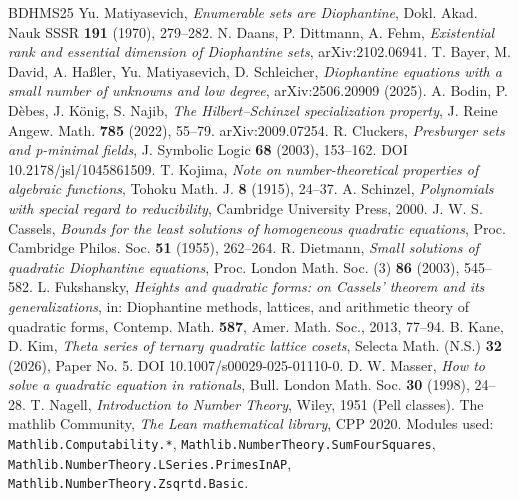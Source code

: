 \documentclass[11pt]{article}
\theoremstyle{plain}
\theoremstyle{definition}
\theoremstyle{remark}
\theoremstyle{plain}
\theoremstyle{definition}
\theoremstyle{remark}
\theoremstyle{plain}
\theoremstyle{definition}
\theoremstyle{remark}
\begin{document}
\begin{thebibliography}{BDHMS25}
 Yu. Matiyasevich, \emph{Enumerable sets are Diophantine}, Dokl. Akad. Nauk SSSR \textbf{191} (1970), 279–282.
 N. Daans, P. Dittmann, A. Fehm, \emph{Existential rank and essential dimension of Diophantine sets}, arXiv:2102.06941.
 T. Bayer, M. David, A. Haßler, Yu. Matiyasevich, D. Schleicher, \emph{Diophantine equations with a small number of unknowns and low degree}, arXiv:2506.20909 (2025).
 A. Bodin, P. Dèbes, J. König, S. Najib, \emph{The Hilbert--Schinzel specialization property}, J. Reine Angew. Math. \textbf{785} (2022), 55--79. arXiv:2009.07254.
 R. Cluckers, \emph{Presburger sets and p-minimal fields}, J. Symbolic Logic \textbf{68} (2003), 153–162. DOI 10.2178/jsl/1045861509.
 T. Kojima, \emph{Note on number-theoretical properties of algebraic functions}, Tohoku Math. J. \textbf{8} (1915), 24--37.
 A. Schinzel, \emph{Polynomials with special regard to reducibility}, Cambridge University Press, 2000.
 J. W. S. Cassels, \emph{Bounds for the least solutions of homogeneous quadratic equations}, Proc. Cambridge Philos. Soc. \textbf{51} (1955), 262–264.
 R. Dietmann, \emph{Small solutions of quadratic Diophantine equations}, Proc. London Math. Soc. (3) \textbf{86} (2003), 545–582.
 L. Fukshansky, \emph{Heights and quadratic forms: on Cassels' theorem and its generalizations}, in: Diophantine methods, lattices, and arithmetic theory of quadratic forms, Contemp. Math. \textbf{587}, Amer. Math. Soc., 2013, 77–94.
 B. Kane, D. Kim, \emph{Theta series of ternary quadratic lattice cosets}, Selecta Math. (N.S.) \textbf{32} (2026), Paper No. 5. DOI 10.1007/s00029-025-01110-0.
 D. W. Masser, \emph{How to solve a quadratic equation in rationals}, Bull. London Math. Soc. \textbf{30} (1998), 24–28.
 T. Nagell, \emph{Introduction to Number Theory}, Wiley, 1951 (Pell classes).
 The mathlib Community, \emph{The Lean mathematical library}, CPP 2020. Modules used: \texttt{Mathlib.\allowbreak{}Computability.\allowbreak{}*}, \texttt{Mathlib.\allowbreak{}NumberTheory.\allowbreak{}SumFourSquares}, \texttt{Mathlib.\allowbreak{}NumberTheory.\allowbreak{}LSeries.\allowbreak{}PrimesInAP}, \texttt{Mathlib.\allowbreak{}NumberTheory.\allowbreak{}Zsqrtd.\allowbreak{}Basic}.
\end{thebibliography}
\end{document}
